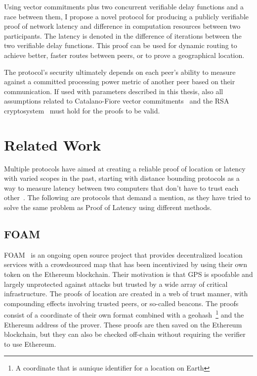 Using vector commitments plus two concurrent verifiable delay functions and a race between them, I propose a novel protocol for producing a publicly verifiable proof of network latency and difference in computation resources between two participants. The latency is denoted in the difference of iterations between the two verifiable delay functions. This proof can be used for dynamic routing to achieve better, faster routes between peers, or to prove a geographical location.

The protocol's security ultimately depends on each peer's ability to measure against a committed processing power metric of another peer based on their communication. If used with parameters described in this thesis, also all assumptions related to Catalano-Fiore vector commitments~\cite{Catalano2013-jn} and the RSA cryptosystem~\cite{Rivest1978-fm} must hold for the proofs to be valid.

\section{Related Work}
Multiple protocols have aimed at creating a reliable proof of location or latency with varied scopes in the past, starting with distance bounding protocols as a way to measure latency between two computers that don't have to trust each other~\cite{Brands1994-iy}. The following are protocols that demand a mention, as they have tried to solve the same problem as Proof of Latency using different methods.

\subsection{FOAM}
FOAM~\cite{Foamspace_Corp2018-me} is an ongoing open source project that provides decentralized location services with a crowdsourced map that has been incentivized by using their own token on the Ethereum blockchain. Their motivation is that GPS is spoofable and largely unprotected against attacks but trusted by a wide array of critical infrastructure. The proofs of location are created in a web of trust manner, with compounding effects involving trusted peers, or so-called beacons. The proofs consist of a coordinate of their own format combined with a geohash~\footnote{A coordinate that is aunique identifier for a location on Earth} and the Ethereum address of the prover. These proofs are then saved on the Ethereum blockchain, but they can also be checked off-chain without requiring the verifier to use Ethereum.

